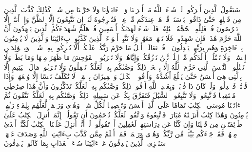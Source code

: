 \stopbuffer
\startbuffer[\q:6:148]
سَیَقُولُ ٱلَّذِینَ أَشۡرَكُوا۟ لَوۡ شَاۤءَ ٱللَّهُ مَاۤ أَشۡرَكۡنَا وَلَاۤ ءَابَاۤؤُنَا وَلَا حَرَّمۡنَا مِن شَیۡءࣲۚ كَذَٰلِكَ كَذَّبَ ٱلَّذِینَ مِن قَبۡلِهِمۡ حَتَّىٰ ذَاقُوا۟ بَأۡسَنَاۗ قُلۡ هَلۡ عِندَكُم مِّنۡ عِلۡمࣲ فَتُخۡرِجُوهُ لَنَاۤۖ إِن تَتَّبِعُونَ إِلَّا ٱلظَّنَّ وَإِنۡ أَنتُمۡ إِلَّا تَخۡرُصُونَ%
\stopbuffer
\startbuffer[\q:6:149]
قُلۡ فَلِلَّهِ ٱلۡحُجَّةُ ٱلۡبَٰلِغَةُۖ فَلَوۡ شَاۤءَ لَهَدَىٰكُمۡ أَجۡمَعِینَ%
\stopbuffer
\startbuffer[\q:6:150]
قُلۡ هَلُمَّ شُهَدَاۤءَكُمُ ٱلَّذِینَ یَشۡهَدُونَ أَنَّ ٱللَّهَ حَرَّمَ هَٰذَاۖ فَإِن شَهِدُوا۟ فَلَا تَشۡهَدۡ مَعَهُمۡۚ وَلَا تَتَّبِعۡ أَهۡوَاۤءَ ٱلَّذِینَ كَذَّبُوا۟ بِءَایَٰتِنَا وَٱلَّذِینَ لَا یُؤۡمِنُونَ بِٱلۡءَاخِرَةِ وَهُم بِرَبِّهِمۡ یَعۡدِلُونَ%
\stopbuffer
\startbuffer[\q:6:151]
۞ قُلۡ تَعَالَوۡا۟ أَتۡلُ مَا حَرَّمَ رَبُّكُمۡ عَلَیۡكُمۡۖ أَلَّا تُشۡرِكُوا۟ بِهِۦ شَیۡءࣰاۖ وَبِٱلۡوَٰلِدَیۡنِ إِحۡسَٰنࣰاۖ وَلَا تَقۡتُلُوۤا۟ أَوۡلَٰدَكُم مِّنۡ إِمۡلَٰقࣲ نَّحۡنُ نَرۡزُقُكُمۡ وَإِیَّاهُمۡۖ وَلَا تَقۡرَبُوا۟ ٱلۡفَوَٰحِشَ مَا ظَهَرَ مِنۡهَا وَمَا بَطَنَۖ وَلَا تَقۡتُلُوا۟ ٱلنَّفۡسَ ٱلَّتِی حَرَّمَ ٱللَّهُ إِلَّا بِٱلۡحَقِّۚ ذَٰلِكُمۡ وَصَّىٰكُم بِهِۦ لَعَلَّكُمۡ تَعۡقِلُونَ%
\stopbuffer
\startbuffer[\q:6:152]
وَلَا تَقۡرَبُوا۟ مَالَ ٱلۡیَتِیمِ إِلَّا بِٱلَّتِی هِیَ أَحۡسَنُ حَتَّىٰ یَبۡلُغَ أَشُدَّهُۥۚ وَأَوۡفُوا۟ ٱلۡكَیۡلَ وَٱلۡمِیزَانَ بِٱلۡقِسۡطِۖ لَا نُكَلِّفُ نَفۡسًا إِلَّا وُسۡعَهَاۖ وَإِذَا قُلۡتُمۡ فَٱعۡدِلُوا۟ وَلَوۡ كَانَ ذَا قُرۡبَىٰۖ وَبِعَهۡدِ ٱللَّهِ أَوۡفُوا۟ۚ ذَٰلِكُمۡ وَصَّىٰكُم بِهِۦ لَعَلَّكُمۡ تَذَكَّرُونَ%
\stopbuffer
\startbuffer[\q:6:153]
وَأَنَّ هَٰذَا صِرَٰطِی مُسۡتَقِیمࣰا فَٱتَّبِعُوهُۖ وَلَا تَتَّبِعُوا۟ ٱلسُّبُلَ فَتَفَرَّقَ بِكُمۡ عَن سَبِیلِهِۦۚ ذَٰلِكُمۡ وَصَّىٰكُم بِهِۦ لَعَلَّكُمۡ تَتَّقُونَ%
\stopbuffer
\startbuffer[\q:6:154]
ثُمَّ ءَاتَیۡنَا مُوسَى ٱلۡكِتَٰبَ تَمَامًا عَلَى ٱلَّذِیۤ أَحۡسَنَ وَتَفۡصِیلࣰا لِّكُلِّ شَیۡءࣲ وَهُدࣰى وَرَحۡمَةࣰ لَّعَلَّهُم بِلِقَاۤءِ رَبِّهِمۡ یُؤۡمِنُونَ%
\stopbuffer
\startbuffer[\q:6:155]
وَهَٰذَا كِتَٰبٌ أَنزَلۡنَٰهُ مُبَارَكࣱ فَٱتَّبِعُوهُ وَٱتَّقُوا۟ لَعَلَّكُمۡ تُرۡحَمُونَ%
\stopbuffer
\startbuffer[\q:6:156]
أَن تَقُولُوۤا۟ إِنَّمَاۤ أُنزِلَ ٱلۡكِتَٰبُ عَلَىٰ طَاۤئِفَتَیۡنِ مِن قَبۡلِنَا وَإِن كُنَّا عَن دِرَاسَتِهِمۡ لَغَٰفِلِینَ%
\stopbuffer
\startbuffer[\q:6:157]
أَوۡ تَقُولُوا۟ لَوۡ أَنَّاۤ أُنزِلَ عَلَیۡنَا ٱلۡكِتَٰبُ لَكُنَّاۤ أَهۡدَىٰ مِنۡهُمۡۚ فَقَدۡ جَاۤءَكُم بَیِّنَةࣱ مِّن رَّبِّكُمۡ وَهُدࣰى وَرَحۡمَةࣱۚ فَمَنۡ أَظۡلَمُ مِمَّن كَذَّبَ بِءَایَٰتِ ٱللَّهِ وَصَدَفَ عَنۡهَاۗ سَنَجۡزِی ٱلَّذِینَ یَصۡدِفُونَ عَنۡ ءَایَٰتِنَا سُوۤءَ ٱلۡعَذَابِ بِمَا كَانُوا۟ یَصۡدِفُونَ%
\stopbuffer
\startbuffer[\q:6:158]
